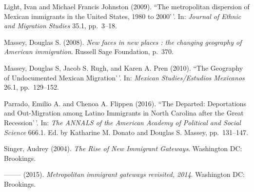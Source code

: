 \documentclass[11pt,]{article}
\begin{document}
Light, Ivan and Michael Francis Johnston (2009). ``The metropolitan
dispersion of Mexican immigrants in the United States, 1980 to 2000'\,'.
In: \emph{Journal of Ethnic and Migration Studies} 35.1, pp.~3--18.

Massey, Douglas S. (2008).
\emph{New faces in new places : the changing geography of American immigration}.
Russell Sage Foundation, p.~370.

Massey, Douglas S, Jacob S. Rugh, and Karen A. Pren (2010). ``The
Geography of Undocumented Mexican Migration'\,'. In:
\emph{Mexican Studies/Estudios Mexicanos} 26.1, pp.~129--152.

Parrado, Emilio A. and Chenoa A. Flippen (2016). ``The Departed:
Deportations and Out-Migration among Latino Immigrants in North Carolina
after the Great Recession'\,'. In:
\emph{The ANNALS of the American Academy of Political and Social Science}
666.1. Ed. by Katharine M. Donato and Douglas S. Massey, pp.~131--147.

Singer, Audrey (2004). \emph{The Rise of New Immigrant Gateways}.
Washington DC: Brookings.

-------- (2015). \emph{Metropolitan immigrant gateways revisited, 2014}.
Washington DC: Brookings.
\end{document}
